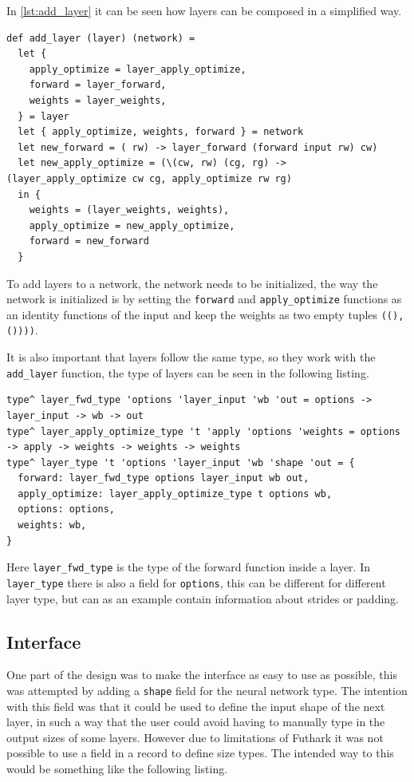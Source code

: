 In \autoref{lst:add_layer} it can be seen how layers can be composed in a simplified way.

\begin{lstlisting}[caption=A simplified version of adding a layer to a network, label={lst:add_layer}]
def add_layer (layer) (network) =
  let {
    apply_optimize = layer_apply_optimize,
    forward = layer_forward,
    weights = layer_weights,
  } = layer
  let { apply_optimize, weights, forward } = network
  let new_forward = ( rw) -> layer_forward (forward input rw) cw)
  let new_apply_optimize = (\(cw, rw) (cg, rg) -> (layer_apply_optimize cw cg, apply_optimize rw rg)
  in {
    weights = (layer_weights, weights),
    apply_optimize = new_apply_optimize,
    forward = new_forward
  }
\end{lstlisting}

To add layers to a network, the network needs to be initialized, the way the network is initialized is by setting the \texttt{forward} and \texttt{apply\_optimize} functions as an identity functions of the input and keep the weights as two empty tuples \texttt{((), ())))}.

It is also important that layers follow the same type, so they work with the \texttt{add\_layer} function, the type of layers can be seen in the following listing.

\begin{lstlisting}
type^ layer_fwd_type 'options 'layer_input 'wb 'out = options -> layer_input -> wb -> out
type^ layer_apply_optimize_type 't 'apply 'options 'weights = options -> apply -> weights -> weights -> weights
type^ layer_type 't 'options 'layer_input 'wb 'shape 'out = {
  forward: layer_fwd_type options layer_input wb out,
  apply_optimize: layer_apply_optimize_type t options wb,
  options: options,
  weights: wb,
}
\end{lstlisting}

Here \texttt{layer\_fwd\_type} is the type of the forward function inside a layer. In \texttt{layer\_type} there is also a field for \texttt{options}, this can be different for different layer type, but can as an example contain information about strides or padding.

\subsection{Interface}

One part of the design was to make the interface as easy to use as possible, this was attempted by adding a \texttt{shape} field for the neural network type. The intention with this field was that it could be used to define the input shape of the next layer, in such a way that the user could avoid having to manually type in the output sizes of some layers. However due to limitations of Futhark it was not possible to use a field in a record to define size types. The intended way to this would be something like the following listing.

